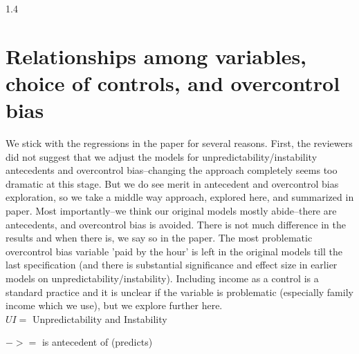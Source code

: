 \documentclass[10pt, letterpaper]{article}
\newcommand{\emd}[1]{\ExecuteMetaData[/tmp/tex]{#1}} %
\begin{document}
\begin{spacing}{1.4} %




\tableofcontents

\section{Relationships among variables, choice of controls, and overcontrol bias} %




We stick with the regressions in the paper for several reasons. First, the reviewers did not suggest that we adjust the models for
unpredictability/instability antecedents and overcontrol bias--changing the approach completely seems too dramatic at this stage. But we do see merit in antecedent and overcontrol bias exploration, so we take a middle way approach, explored here, and summarized in paper. Most importantly--we think our original models mostly
abide--there are antecedents, and overcontrol bias is avoided. There is not much difference in the results and when there is, we say so in the paper. The most problematic overcontrol bias variable 'paid by the hour' is left in the original models till the
last specification (and there is substantial significance and effect size in earlier models on unpredictability/instability). Including income as a control is a standard practice and it is unclear if the variable is problematic (especially family income which we use), but we explore further here.\\

$UI =$ Unpredictability and Instability

$-> =$ is antecedent of (predicts)\\


\end{spacing}
\end{document}
